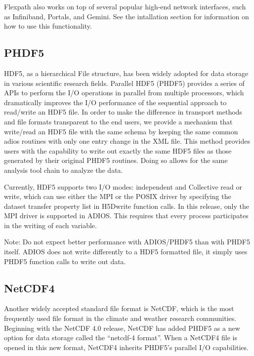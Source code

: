 Flexpath also works on top of several popular high-end network interfaces, such as Infiniband, Portals, and Gemini. See the intallation section for information on how to use this functionality. 


\subsection{PHDF5}

HDF5, as a hierarchical File structure, has been widely adopted for data storage 
in various scientific research fields.  Parallel HDF5 (PHDF5) provides a series 
of APIs to perform the I/O operations in parallel from multiple processors, which 
dramatically improves the I/O performance of the sequential approach to read/write 
an HDF5 file. In order to make the difference in transport methods and file formats 
transparent to the end users, we provide a mechanism that write/read an HDF5 file 
with the same schema by keeping the same common adios routines with only one entry 
change in the XML file. This method provides users with the capability to write 
out exactly the same HDF5 files as those generated by their original PHDF5 routines. 
Doing so allows for the same analysis tool chain to analyze the data. 

Currently, HDF5 supports two I/O modes: independent and Collective read or write, 
which can use either the MPI or the POSIX driver by specifying the dataset transfer 
property list in H5Dwrite function calls. In this release, only the MPI driver 
is supported in ADIOS.
This requires that every process participates in the writing of each variable. 

Note: Do not expect better performance with ADIOS/PHDF5 than with PHDF5 itself. ADIOS does not write differently to a HDF5 formatted file, it simply uses PHDF5 function calls to write out data. 


\subsection{NetCDF4}

Another widely accepted standard file format is NetCDF, which is the most frequently 
used file format in the climate and weather research communities.  Beginning with 
the NetCDF 4.0 release, NetCDF has added PHDF5 as a new option for data storage 
called the ``netcdf-4 format''.  When a NetCDF4 file is opened in this new format, 
NetCDF4 inherits PHDF5's parallel I/O capabilities.

